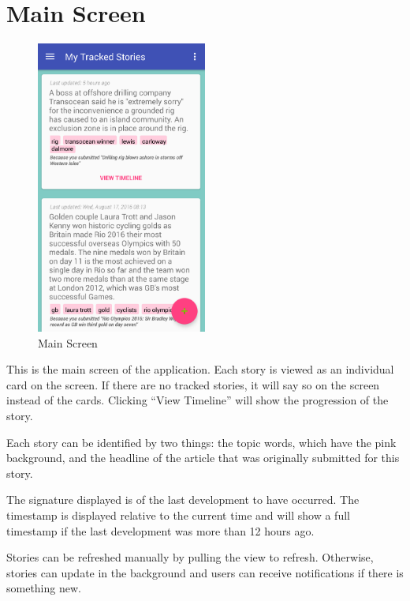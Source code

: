 \documentclass[11pt,titlepage]{report}
\begin{document}
\section{Main Screen}
\begin{figure}
	\vspace{-1cm}
	\begin{center}
		\includegraphics[width=0.5\textwidth]{img/mainScreen.png}
	\end{center}
	\caption{Main Screen}
	\vspace{-4cm}
\end{figure}
This is the main screen of the application. Each story is viewed as an individual card on the screen. If there are no tracked stories, it will say so on the screen instead of the cards. Clicking ``View Timeline'' will show the progression of the story.

Each story can be identified by two things: the topic words, which have the pink background, and the headline of the article that was originally submitted for this story.

The signature displayed is of the last development to have occurred. The timestamp is displayed relative to the current time and will show a full timestamp if the last development was more than 12 hours ago.

Stories can be refreshed manually by pulling the view to refresh. Otherwise, stories can update in the background and users can receive notifications if there is something new.
\end{document}
